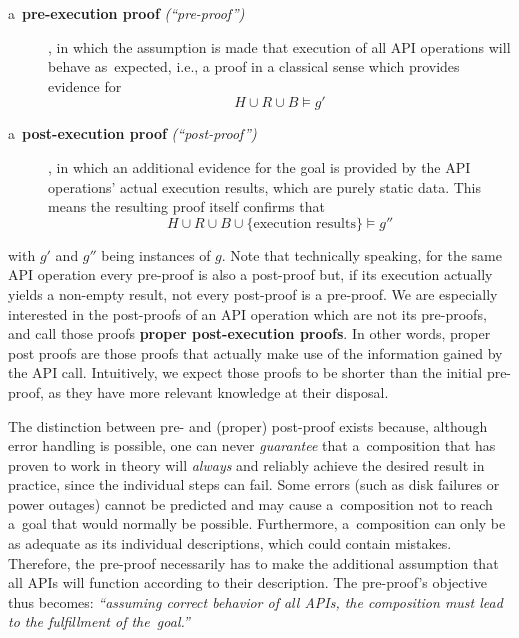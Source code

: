 \begin{description}
\item [a~{\bf pre-execution proof} \emph{(``pre-proof'')}]\hspace{-1ex},
      in which the assumption is made that execution of all API operations
      will behave as~expected, i.e., a proof in a classical sense which provides evidence for
      \[ H\cup R \cup B \models g'\]
\item [a~{\bf post-execution proof} \emph{(``post-proof'')}]\hspace{-1ex},
      in which an additional evidence for the goal %
      is provided by
      the API operations' actual execution results,
      which are purely static data. 
      This means 
      the resulting proof itself confirms that %
      \[H \cup R \cup B \cup \{\text{execution results}\} \models g'' \]
\end{description}
with $g'$ and $g''$ being instances of $g$.
Note that technically speaking,
for the same API operation every pre-proof is also a post-proof but,
if its execution actually yields a non-empty result,
not every post-proof is a pre-proof.
We are especially interested in the post-proofs of an API operation which are not its pre-proofs,
and call those proofs
\textbf{proper post-execution proofs}.
In other words, proper post proofs are those proofs
that actually make use of the information gained by the API call.
Intuitively, we expect those proofs to be shorter than the initial pre-proof,
as they have more relevant knowledge at their disposal.

The distinction between pre- and  (proper) post-proof exists because,
although error handling is possible,
one can never \emph{guarantee} that a~composition that has proven to work in theory
will \emph{always} and reliably achieve the desired result in practice,
since the individual steps can fail.
Some errors (such as disk failures or power outages) cannot be predicted
and may cause a~composition not to reach a~goal that would normally be possible.
Furthermore, a~composition can only be as adequate
as its individual descriptions, which could contain mistakes.
Therefore, the pre-proof necessarily has to make the additional assumption
that all APIs will function according to their description.
The pre-proof's objective thus becomes:
\emph{``assuming correct behavior of all APIs,
      the composition must lead to the fulfillment of the~goal.''}

